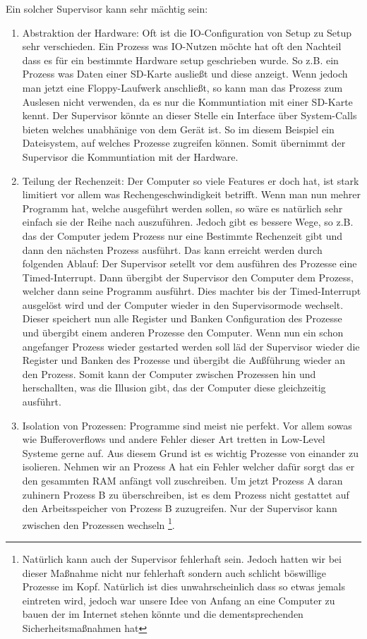 \documentclass{scrartcl}
\begin{document}
Ein solcher Supervisor kann sehr mächtig sein:

\begin{enumerate}
	\item Abstraktion der Hardware: Oft ist die IO-Configuration von Setup zu Setup sehr verschieden. Ein Prozess was IO-Nutzen möchte hat oft den Nachteil dass es für ein bestimmte Hardware setup geschrieben wurde. So z.B. ein Prozess was Daten einer SD-Karte ausließt und diese anzeigt. Wenn jedoch man jetzt eine Floppy-Laufwerk anschließt, so kann man das Prozess zum Auslesen nicht verwenden, da es nur die Kommuntiation mit einer SD-Karte kennt. Der Supervisor könnte an dieser Stelle ein Interface über System-Calls bieten welches unabhänige von dem Gerät ist. So im diesem Beispiel ein Dateisystem, auf welches Prozesse zugreifen können. Somit übernimmt der Supervisor die Kommuntiation mit der Hardware.
	
	\item Teilung der Rechenzeit: Der Computer so viele Features er doch hat, ist stark limitiert vor allem was Rechengeschwindigkeit betrifft. Wenn man nun mehrer Programm hat, welche ausgeführt werden sollen, so wäre es natürlich sehr einfach sie der Reihe nach auszuführen. Jedoch gibt es bessere Wege, so z.B. das der Computer jedem Prozess nur eine Bestimmte Rechenzeit gibt und dann den nächsten Prozess ausführt. Das kann erreicht werden durch folgenden Ablauf: Der Supervisor setellt vor dem ausführen des Prozesse eine Timed-Interrupt. Dann übergibt der Supervisor den Computer dem Prozess, welcher dann seine Programm ausführt. Dies machter bis der Timed-Interrupt ausgelöst wird und der Computer wieder in den Supervisormode wechselt. Dieser speichert nun alle Register und Banken Configuration des Prozesse und übergibt einem anderen Prozesse den Computer. Wenn nun ein schon angefanger Prozess wieder gestarted werden soll läd der Supervisor wieder die Register und Banken des Prozesse und übergibt die Außführung wieder an den Prozess. Somit kann der Computer zwischen Prozessen hin und herschallten, was die Illusion gibt, das der Computer diese gleichzeitig ausführt.
	
	\item Isolation von Prozessen: Programme sind meist nie perfekt. Vor allem sowas wie Bufferoverflows und andere Fehler dieser Art tretten in Low-Level Systeme gerne auf. Aus diesem Grund ist es wichtig Prozesse von einander zu isolieren. Nehmen wir an Prozess A hat ein Fehler welcher dafür sorgt das er den gesammten RAM anfängt voll zuschreiben. Um jetzt Prozess A daran zuhinern Prozess B zu überschreiben, ist es dem Prozess nicht gestattet auf den Arbeitsspeicher von Prozess B zuzugreifen. Nur der Supervisor kann zwischen den Prozessen wechseln
	\footnote{Natürlich kann auch der Supervisor fehlerhaft sein. Jedoch hatten wir bei dieser Maßnahme nicht nur fehlerhaft sondern auch schlicht böswillige Prozesse im Kopf. Natürlich ist dies unwahrscheinlich dass so etwas jemals eintreten wird, jedoch war unsere Idee von Anfang an eine Computer zu bauen der im Internet stehen könnte und die dementsprechenden Sicherheitsmaßnahmen hat}.
\end{enumerate}
\end{document}

